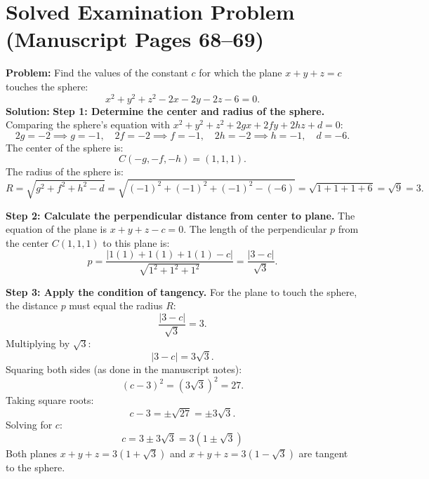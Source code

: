 \section{Solved Examination Problem (Manuscript Pages 68--69)}

\begin{examplebox}
\textbf{Problem:} Find the values of the constant $c$ for which the plane $x + y + z = c$ touches the sphere:
\begin{equation*}
    x^2 + y^2 + z^2 - 2x - 2y - 2z - 6 = 0.
\end{equation*}
\tcblower
\textbf{Solution:}
\textbf{Step 1: Determine the center and radius of the sphere.}
Comparing the sphere's equation with $x^2 + y^2 + z^2 + 2gx + 2fy + 2hz + d = 0$:
\begin{equation}
    2g = -2 \implies g = -1, \quad 2f = -2 \implies f = -1, \quad 2h = -2 \implies h = -1, \quad d = -6.
\end{equation}
The center of the sphere is:
\begin{equation}
    C(-g, -f, -h) = (1, 1, 1).
\end{equation}
The radius of the sphere is:
\begin{equation}
    R = \sqrt{g^2 + f^2 + h^2 - d} = \sqrt{(-1)^2 + (-1)^2 + (-1)^2 - (-6)} = \sqrt{1 + 1 + 1 + 6} = \sqrt{9} = 3.
\end{equation}

\textbf{Step 2: Calculate the perpendicular distance from center to plane.}
The equation of the plane is $x + y + z - c = 0$.
The length of the perpendicular $p$ from the center $C(1, 1, 1)$ to this plane is:
\begin{equation}
    p = \frac{|1(1) + 1(1) + 1(1) - c|}{\sqrt{1^2 + 1^2 + 1^2}} = \frac{|3 - c|}{\sqrt{3}}.
\end{equation}

\textbf{Step 3: Apply the condition of tangency.}
For the plane to touch the sphere, the distance $p$ must equal the radius $R$:
\begin{equation}
    \frac{|3 - c|}{\sqrt{3}} = 3.
\end{equation}
Multiplying by $\sqrt{3}$:
\begin{equation}
    |3 - c| = 3\sqrt{3}.
\end{equation}
Squaring both sides (as done in the manuscript notes):
\begin{equation}
    (c - 3)^2 = (3\sqrt{3})^2 = 27.
\end{equation}
Taking square roots:
\begin{equation}
    c - 3 = \pm \sqrt{27} = \pm 3\sqrt{3}.
\end{equation}
Solving for $c$:
\begin{equation}
    \boxed{c = 3 \pm 3\sqrt{3} = 3(1 \pm \sqrt{3})}
\end{equation}
Both planes $x + y + z = 3(1 + \sqrt{3})$ and $x + y + z = 3(1 - \sqrt{3})$ are tangent to the sphere.
\end{examplebox}
